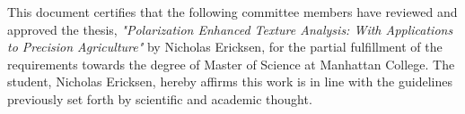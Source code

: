 
\begin{center}
  \begin{minipage}{0.80\textwidth}
        This document certifies that the following committee members have reviewed and approved the thesis, \textit{"Polarization Enhanced Texture Analysis: With Applications to Precision Agriculture"} by Nicholas Ericksen,
        for the partial fulfillment of the requirements towards the degree of Master of Science at Manhattan College. The student, Nicholas Ericksen, hereby affirms this work is in line with the guidelines previously set forth by scientific and academic thought. \\
        \linebreak
        \hspace{25mm}
        \noindent {}
        \noindent {}
        \hspace{15mm}
        \noindent {}
        \noindent {}
  \end{minipage}
  \vspace{0.5cm}
\end{center}
